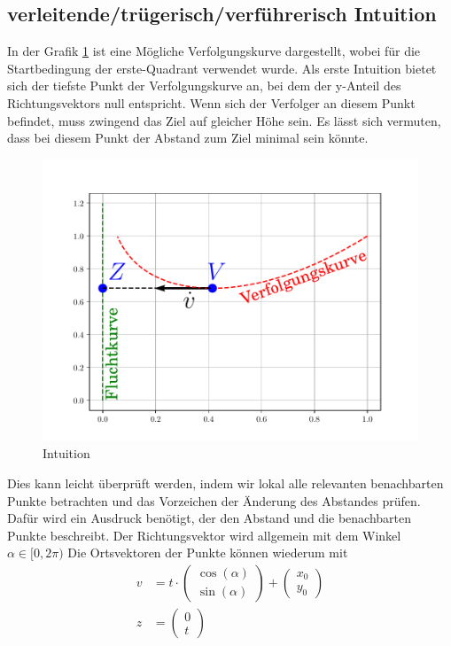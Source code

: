\subsection{verleitende/trügerisch/verführerisch Intuition}
In der Grafik \ref{lambertw:grafic:intuition} ist eine Mögliche Verfolgungskurve dargestellt, wobei für die Startbedingung der erste-Quadrant verwendet wurde.
Als erste Intuition bietet sich der tiefste Punkt der Verfolgungskurve an, bei dem der y-Anteil des Richtungsvektors null entspricht.
Wenn sich der Verfolger an diesem Punkt befindet, muss zwingend das Ziel auf gleicher Höhe sein.
Es lässt sich vermuten, dass bei diesem Punkt der Abstand zum Ziel minimal sein könnte.
\begin{figure}
	\centering
	\includegraphics[scale=0.4]{./papers/lambertw/Bilder/Intuition.pdf}
	\caption{Intuition}
	\label{lambertw:grafic:intuition}
\end{figure}
%
Dies kann leicht überprüft werden, indem wir lokal alle relevanten benachbarten Punkte betrachten und das Vorzeichen der Änderung des Abstandes prüfen.
Dafür wird ein Ausdruck benötigt, der den Abstand und die benachbarten Punkte beschreibt.
Der Richtungsvektor wird allgemein mit dem Winkel $\alpha \in[ 0, 2\pi)$
Die Ortsvektoren der Punkte können wiederum mit
\begin{align}
	v
	&=
	t\cdot\left(\begin{array}{c} \cos (\alpha) \\ \sin (\alpha) \end{array}\right) +\left(\begin{array}{c} x_0 \\ y_0 \end{array}\right)
	\\
	z
	&=
	\left(\begin{array}{c} 0 \\ t \end{array}\right)
\end{align}
